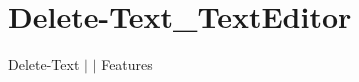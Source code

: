 \chapter{Delete-\/\+Text\+\_\+\+Text\+Editor }
\hypertarget{md__docs_2_text_editor_2_features_2_delete-_text___text_editor}{}\label{md__docs_2_text_editor_2_features_2_delete-_text___text_editor}
Delete-\/\+Text \texorpdfstring{$\vert$}{|}  \texorpdfstring{$\vert$}{|} Features



 